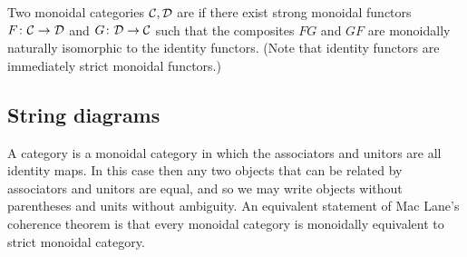Two monoidal categories $\mathcal C, \mathcal D$ are  if
there exist strong monoidal functors $F{\colon} \mathcal C \to \mathcal D$ and $G{\colon} \mathcal D
\to \mathcal C$ such that the composites $FG$ and $GF$ are monoidally naturally
isomorphic to the identity functors. (Note that identity functors are
immediately strict monoidal functors.)

\subsection{String diagrams}
A  category is a monoidal category in which the
associators and unitors are all identity maps. In this case then any two objects
that can be related by associators and unitors are equal, and so we may write
objects without parentheses and units without ambiguity. An equivalent statement
of Mac Lane's coherence theorem is that every monoidal category is monoidally
equivalent to strict monoidal category. 

